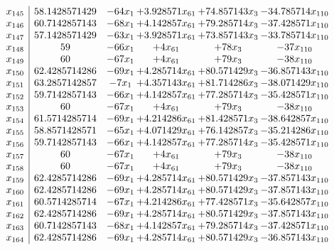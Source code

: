 \documentclass[11pt]{article}
\begin{document}
\[\begin{array}{c| c c@{\hskip 2pt} c@{\hskip 2pt} c@{\hskip 2pt} c@{\hskip 2pt} }
 x_{145}   &  58.1428571429 & -64 x_{1} & + 3.928571 x_{61} & + 74.857143 x_{3} & -34.785714 x_{110}\\
 x_{146}   &  60.7142857143 & -68 x_{1} & + 4.142857 x_{61} & + 79.285714 x_{3} & -37.428571 x_{110}\\
 x_{147}   &  57.1428571429 & -63 x_{1} & + 3.928571 x_{61} & + 73.857143 x_{3} & -33.785714 x_{110}\\
 x_{148}   &  59 & -66 x_{1} & + 4 x_{61} & + 78 x_{3} & -37 x_{110}\\
 x_{149}   &  60 & -67 x_{1} & + 4 x_{61} & + 79 x_{3} & -38 x_{110}\\
 x_{150}   &  62.4285714286 & -69 x_{1} & + 4.285714 x_{61} & + 80.571429 x_{3} & -36.857143 x_{110}\\
 x_{151}   &  63.2857142857 & -7 x_{1} & + 4.357143 x_{61} & + 81.714286 x_{3} & -38.071429 x_{110}\\
 x_{152}   &  59.7142857143 & -66 x_{1} & + 4.142857 x_{61} & + 77.285714 x_{3} & -35.428571 x_{110}\\
 x_{153}   &  60 & -67 x_{1} & + 4 x_{61} & + 79 x_{3} & -38 x_{110}\\
 x_{154}   &  61.5714285714 & -69 x_{1} & + 4.214286 x_{61} & + 81.428571 x_{3} & -38.642857 x_{110}\\
 x_{155}   &  58.8571428571 & -65 x_{1} & + 4.071429 x_{61} & + 76.142857 x_{3} & -35.214286 x_{110}\\
 x_{156}   &  59.7142857143 & -66 x_{1} & + 4.142857 x_{61} & + 77.285714 x_{3} & -35.428571 x_{110}\\
 x_{157}   &  60 & -67 x_{1} & + 4 x_{61} & + 79 x_{3} & -38 x_{110}\\
 x_{158}   &  60 & -67 x_{1} & + 4 x_{61} & + 79 x_{3} & -38 x_{110}\\
 x_{159}   &  62.4285714286 & -69 x_{1} & + 4.285714 x_{61} & + 80.571429 x_{3} & -37.857143 x_{110}\\
 x_{160}   &  62.4285714286 & -69 x_{1} & + 4.285714 x_{61} & + 80.571429 x_{3} & -37.857143 x_{110}\\
 x_{161}   &  60.5714285714 & -67 x_{1} & + 4.214286 x_{61} & + 77.428571 x_{3} & -35.642857 x_{110}\\
 x_{162}   &  62.4285714286 & -69 x_{1} & + 4.285714 x_{61} & + 80.571429 x_{3} & -37.857143 x_{110}\\
 x_{163}   &  60.7142857143 & -68 x_{1} & + 4.142857 x_{61} & + 79.285714 x_{3} & -37.428571 x_{110}\\
 x_{164}   &  62.4285714286 & -69 x_{1} & + 4.285714 x_{61} & + 80.571429 x_{3} & -36.857143 x_{110}\\

\end{array}\]
\end{document}
